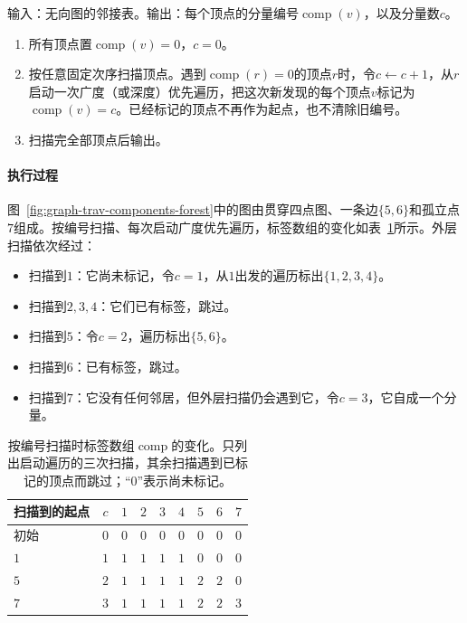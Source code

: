 \begin{algorithm}[无向连通分量编号]
\label{alg:graph-trav-components}
输入：无向图的邻接表。输出：每个顶点的分量编号$\operatorname{comp}(v)$，以及分量数$c$。
\begin{enumerate}
  \item 所有顶点置$\operatorname{comp}(v)=0$，$c=0$。
  \item 按任意固定次序扫描顶点。遇到$\operatorname{comp}(r)=0$的顶点$r$时，令$c\gets c+1$，从$r$启动一次广度（或深度）优先遍历，把这次新发现的每个顶点$v$标记为$\operatorname{comp}(v)=c$。已经标记的顶点不再作为起点，也不清除旧编号。
  \item 扫描完全部顶点后输出。
\end{enumerate}
\end{algorithm}

\paragraph{执行过程}
图~\ref{fig:graph-trav-components-forest}中的图由贯穿四点图、一条边$\{5,6\}$和孤立点$7$组成。按编号扫描、每次启动广度优先遍历，标签数组的变化如表~\ref{tab:graph-trav-components-trace}所示。外层扫描依次经过：
\begin{itemize}
  \item 扫描到$1$：它尚未标记，令$c=1$，从$1$出发的遍历标出$\{1,2,3,4\}$。
  \item 扫描到$2,3,4$：它们已有标签，跳过。
  \item 扫描到$5$：令$c=2$，遍历标出$\{5,6\}$。
  \item 扫描到$6$：已有标签，跳过。
  \item 扫描到$7$：它没有任何邻居，但外层扫描仍会遇到它，令$c=3$，它自成一个分量。
\end{itemize}

\begin{table}[!htb]
  \centering
  \small
  \begin{tabular}{@{}lcccccccc@{}}
    \toprule
    扫描到的起点 & $c$ & $1$ & $2$ & $3$ & $4$ & $5$ & $6$ & $7$ \\
    \midrule
    初始 & $0$ & $0$ & $0$ & $0$ & $0$ & $0$ & $0$ & $0$ \\
    $1$ & $1$ & $1$ & $1$ & $1$ & $1$ & $0$ & $0$ & $0$ \\
    $5$ & $2$ & $1$ & $1$ & $1$ & $1$ & $2$ & $2$ & $0$ \\
    $7$ & $3$ & $1$ & $1$ & $1$ & $1$ & $2$ & $2$ & $3$ \\
    \bottomrule
  \end{tabular}
  \caption{按编号扫描时标签数组$\operatorname{comp}$的变化。只列出启动遍历的三次扫描，其余扫描遇到已标记的顶点而跳过；“$0$”表示尚未标记。}
  \label{tab:graph-trav-components-trace}
\end{table}

